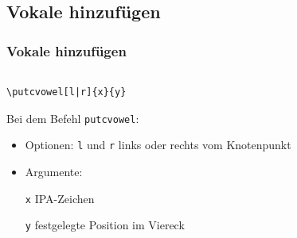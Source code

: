 \subsection{Vokale hinzufügen}

\begin{frame}[fragile]
\frametitle{Vokale hinzufügen}

\begin{columns}
	
\begin{column}{.65\textwidth}

\begin{lstlisting}
\putcvowel[l|r]{x}{y}
\end{lstlisting}

Bei dem Befehl \lstinline|putcvowel|:

\begin{itemize}
	\item Optionen: \lstinline|l| und \lstinline|r| \ras links oder rechts vom Knotenpunkt
		
	\item Argumente: 
		
	\lstinline|x| \ras IPA-Zeichen
		
	\lstinline|y| \ras festgelegte Position im Viereck
	
\end{itemize}


\end{column}
\begin{column}{.35\textwidth}


\begin{vowel}
\end{vowel}


\end{column}
\end{columns}
\end{frame}
